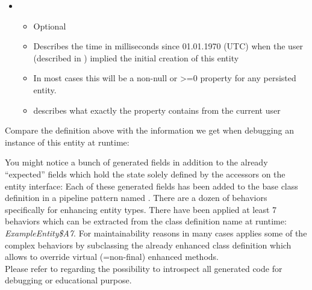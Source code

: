 \begin{itemize}
\begin{itemize}
		\end{itemize}
	\item {}
		\begin{itemize}
			\item Optional
			\item Describes the time in milliseconds since 01.01.1970 (UTC) when the user (described in ) implied the initial creation of this entity
			\item In most cases this will be a non-null or >=0 property for any persisted entity.
			\item {} describes what exactly the property contains from the current user
		\end{itemize}
\end{itemize}

Compare the definition above with the information we get when debugging an instance of this entity at runtime:\\

\def\showimgref{img/ExampleEntity-DebugEclipse}

You might notice a bunch of generated fields in addition to the already ``expected'' fields which hold the state solely defined by the accessors on the entity interface: Each of these generated fields has been added to the base class definition in a pipeline pattern named . There are a dozen of behaviors specifically for enhancing entity types. There have been applied at least 7 behaviors which can be extracted from the class definition name at runtime: \emph{ExampleEntity\$A7}. For maintainability reasons in many cases \AMBETH{} applies some of the complex behaviors by subclassing the already enhanced class definition which allows to override virtual (=non-final) enhanced methods.\\

Please refer to  regarding the possibility to introspect all \AMBETH{} generated code for debugging or educational purpose.
